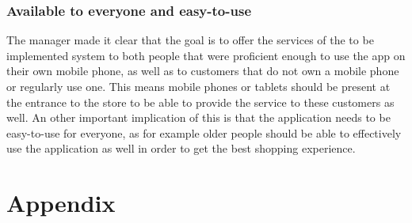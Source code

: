 \documentclass[a4paper]{article}
\begin{document}
\subsubsection*{Available to everyone and easy-to-use}
The manager made it clear that the goal is to offer the services of the to be implemented system to both people that were proficient enough to use the app on their own mobile phone, as well as to customers that do not own a mobile phone or regularly use one. This means mobile phones or tablets should be present at the entrance to the store to be able to provide the service to these customers as well. An other important implication of this is that the application needs to be easy-to-use for everyone, as for example older people should be able to effectively use the application as well in order to get the best shopping experience.


\newpage
\section*{Appendix}
\appendix 
\end{document}
